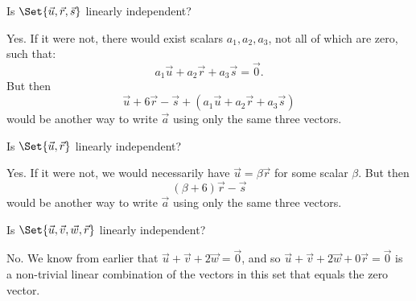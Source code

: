 \documentclass{problemset}
\begin{document}
	\begin{parts}[resume]
		\item Is $\Set{\vec u,\vec r,\vec s}$ linearly independent?
			\begin{solution}
				Yes. If it were not, there would exist scalars $a_1, a_2, a_3$,
				not all of which are zero, such that:
				\[
					a_1 \vec u + a_2 \vec r + a_3\vec s = \vec 0.
				\]
				But then
				\[
					\vec u+6\vec r-\vec s + (a_1 \vec u + a_2 \vec r + a_3\vec s)
				\]
				would be another way to write $\vec a$ using only the same three
				vectors.
			\end{solution}
		\item Is $\Set{\vec u,\vec r}$ linearly independent?
			\begin{solution}
				Yes. If it were not, we would necessarily have $\vec u = \beta \vec r$
				for some scalar $\beta$. But then
				\[
					(\beta + 6) \vec r - \vec s
				\]
				would be another way to write $\vec a$ using only the same three
				vectors.
			\end{solution}
		\item Is $\Set{\vec u,\vec v,\vec w,\vec r}$ linearly independent?
			\begin{solution}
				No. We know from earlier that $\vec u+\vec v+2\vec w=\vec 0$, and
				so $\vec u+\vec v+2\vec w+0\vec r=\vec 0$ is a non-trivial linear
				combination of the vectors in this set that equals the zero vector.
			\end{solution}
	\end{parts}
\end{document}
